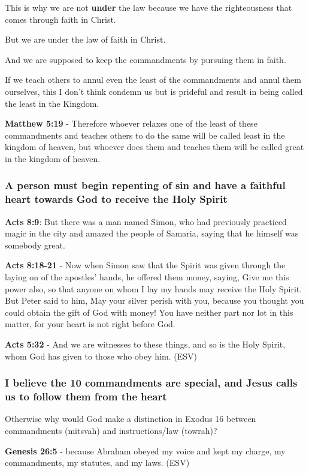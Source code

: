 \documentclass[11pt]{article}
\begin{document}
This is why we are not \textbf{under} the law because we have the righteousness that comes through faith in Christ.

But we are under the law of faith in Christ.

And we are supposed to keep the commandments by pursuing them in faith.

If we teach others to annul even the least of the commandments and annul them ourselves, this I don't think condemn us but is prideful and result in being called the least in the Kingdom.

\textbf{Matthew 5:19} - Therefore whoever relaxes one of the least of these commandments and teaches others to do the same will be called least in the kingdom of heaven, but whoever does them and teaches them will be called great in the kingdom of heaven.

\subsubsection{A person must begin repenting of sin and have a faithful heart towards God to receive the Holy Spirit}
\label{sec:orgd866f56}
\textbf{Acts 8:9}: But there was a man named Simon, who had previously practiced magic in the city and amazed the people of Samaria, saying that he himself was somebody great.

\textbf{Acts 8:18-21} - Now when Simon saw that the Spirit was given through the laying on of the apostles' hands, he offered them money, saying, Give me this power also, so that anyone on whom I lay my hands may receive the Holy Spirit.  But Peter said to him, May your silver perish with you, because you thought you could obtain the gift of God with money!  You have neither part nor lot in this matter, for your heart is not right before God.

\textbf{Acts 5:32} - And we are witnesses to these things, and so is the Holy Spirit, whom God has given to those who obey him. (ESV)

\subsubsection{I believe the 10 commandments are special, and Jesus calls us to follow them from the heart}
\label{sec:org4ba1866}
Otherwise why would God make a distinction in Exodus 16 between commandments (mitsvah) and instructions/law (towrah)?

\textbf{Genesis 26:5} - because Abraham obeyed my voice and kept my charge, my commandments, my statutes, and my laws. (ESV)
\end{document}
